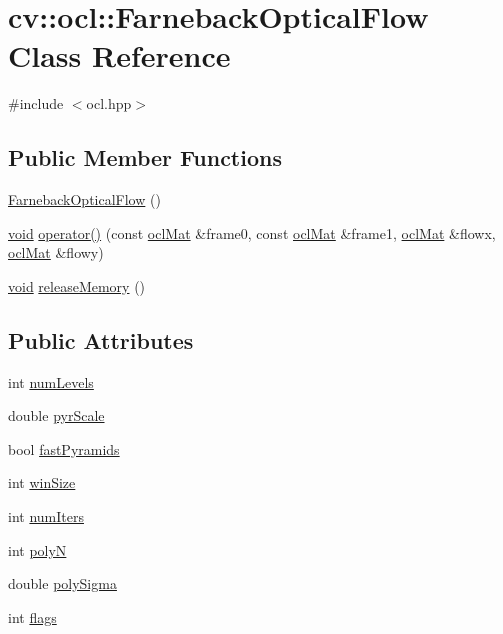 \hypertarget{classcv_1_1ocl_1_1FarnebackOpticalFlow}{\section{cv\-:\-:ocl\-:\-:Farneback\-Optical\-Flow Class Reference}
\label{classcv_1_1ocl_1_1FarnebackOpticalFlow}
}


{\ttfamily \#include $<$ocl.\-hpp$>$}

\subsection*{Public Member Functions}
\begin{DoxyCompactItemize}
\item 
\hyperlink{classcv_1_1ocl_1_1FarnebackOpticalFlow_af05d5da025095f6921702875a06c9c4b}{Farneback\-Optical\-Flow} ()
\item 
\hyperlink{legacy_8hpp_a8bb47f092d473522721002c86c13b94e}{void} \hyperlink{classcv_1_1ocl_1_1FarnebackOpticalFlow_a504525230cffeee449319cd8f0a63114}{operator()} (const \hyperlink{classcv_1_1ocl_1_1oclMat}{ocl\-Mat} \&frame0, const \hyperlink{classcv_1_1ocl_1_1oclMat}{ocl\-Mat} \&frame1, \hyperlink{classcv_1_1ocl_1_1oclMat}{ocl\-Mat} \&flowx, \hyperlink{classcv_1_1ocl_1_1oclMat}{ocl\-Mat} \&flowy)
\item 
\hyperlink{legacy_8hpp_a8bb47f092d473522721002c86c13b94e}{void} \hyperlink{classcv_1_1ocl_1_1FarnebackOpticalFlow_a7c87814eb4dfe9097dc1ce62f91b07c7}{release\-Memory} ()
\end{DoxyCompactItemize}
\subsection*{Public Attributes}
\begin{DoxyCompactItemize}
\item 
int \hyperlink{classcv_1_1ocl_1_1FarnebackOpticalFlow_a1146ddf5754f9fe338bd71dcbc4f9115}{num\-Levels}
\item 
double \hyperlink{classcv_1_1ocl_1_1FarnebackOpticalFlow_ae88bb6add8278fd7d68a5219f92f4886}{pyr\-Scale}
\item 
bool \hyperlink{classcv_1_1ocl_1_1FarnebackOpticalFlow_ae4502926cb1b48e6d4af1047845b48e9}{fast\-Pyramids}
\item 
int \hyperlink{classcv_1_1ocl_1_1FarnebackOpticalFlow_a0b74aa6b83b000a084db675e39dc646f}{win\-Size}
\item 
int \hyperlink{classcv_1_1ocl_1_1FarnebackOpticalFlow_aee9f1a22961a0b2b1cf6a90524420b46}{num\-Iters}
\item 
int \hyperlink{classcv_1_1ocl_1_1FarnebackOpticalFlow_afd1aa2e7969b0c463cb1d68798b3b1d1}{poly\-N}
\item 
double \hyperlink{classcv_1_1ocl_1_1FarnebackOpticalFlow_a2a5e46963654a34e34c151586af769a7}{poly\-Sigma}
\item 
int \hyperlink{classcv_1_1ocl_1_1FarnebackOpticalFlow_aa832a02cf7d56e95f80a8e1d46f9aed6}{flags}
\end{DoxyCompactItemize}



